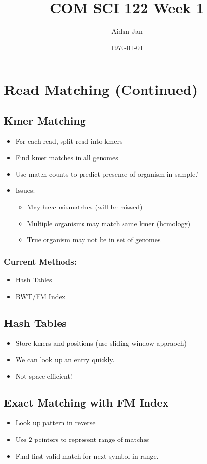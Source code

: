 \documentclass[10pt]{article}
\title{COM SCI 122 Week 1}
\author{Aidan Jan}
\date{\today}
\begin{document}
\maketitle
\section*{Read Matching (Continued)}
\subsection*{Kmer Matching}
\begin{itemize}
    \item For each read, split read into kmers
    \item Find kmer matches in all genomes
    \item Use match counts to predict presence of organism in sample.'
    \item Issues:
    \begin{itemize}
        \item May have mismatches (will be missed)
        \item Multiple organisms may match same kmer (homology)
        \item True organism may not be in set of genomes
    \end{itemize}
\end{itemize}
\subsubsection*{Current Methods:}
\begin{itemize}
    \item Hash Tables
    \item BWT/FM Index
\end{itemize}

\subsection*{Hash Tables}
\begin{itemize}
    \item Store kmers and positions (use sliding window appraoch)
    \item We can look up an entry quickly.
    \item Not space efficient!
\end{itemize}

\subsection*{Exact Matching with FM Index}
\begin{itemize}
    \item Look up pattern in reverse
    \item Use 2 pointers to represent range of matches
    \item Find first valid match for next symbol in range.
\end{itemize}
\end{document}

